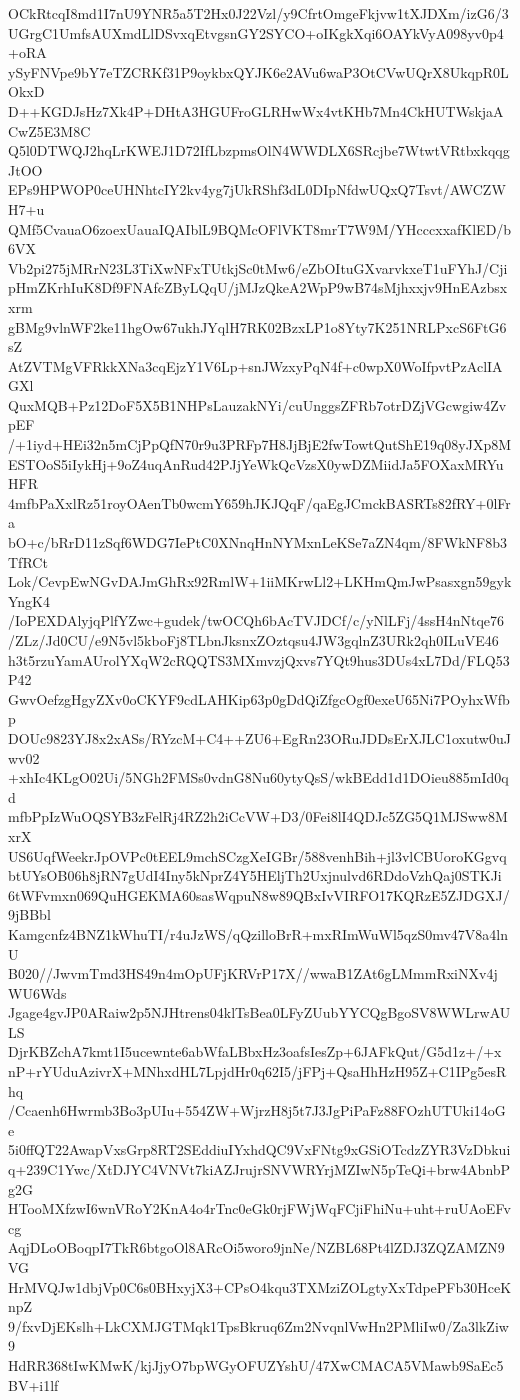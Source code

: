OCkRtcqI8md1I7nU9YNR5a5T2Hx0J22Vzl/y9CfrtOmgeFkjvw1tXJDXm/izG6/3
UGrgC1UmfsAUXmdLlDSvxqEtvgsnGY2SYCO+oIKgkXqi6OAYkVyA098yv0p4+oRA
ySyFNVpe9bY7eTZCRKf31P9oykbxQYJK6e2AVu6waP3OtCVwUQrX8UkqpR0LOkxD
D++KGDJsHz7Xk4P+DHtA3HGUFroGLRHwWx4vtKHb7Mn4CkHUTWskjaACwZ5E3M8C
Q5l0DTWQJ2hqLrKWEJ1D72IfLbzpmsOlN4WWDLX6SRcjbe7WtwtVRtbxkqqgJtOO
EPs9HPWOP0ceUHNhtcIY2kv4yg7jUkRShf3dL0DIpNfdwUQxQ7Tsvt/AWCZWH7+u
QMf5CvauaO6zoexUauaIQAIblL9BQMcOFlVKT8mrT7W9M/YHcccxxafKlED/b6VX
Vb2pi275jMRrN23L3TiXwNFxTUtkjSc0tMw6/eZbOItuGXvarvkxeT1uFYhJ/Cji
pHmZKrhIuK8Df9FNAfcZByLQqU/jMJzQkeA2WpP9wB74sMjhxxjv9HnEAzbsxxrm
gBMg9vlnWF2ke11hgOw67ukhJYqlH7RK02BzxLP1o8Yty7K251NRLPxcS6FtG6sZ
AtZVTMgVFRkkXNa3cqEjzY1V6Lp+snJWzxyPqN4f+c0wpX0WoIfpvtPzAclIAGXl
QuxMQB+Pz12DoF5X5B1NHPsLauzakNYi/cuUnggsZFRb7otrDZjVGcwgiw4ZvpEF
/+1iyd+HEi32n5mCjPpQfN70r9u3PRFp7H8JjBjE2fwTowtQutShE19q08yJXp8M
ESTOoS5iIykHj+9oZ4uqAnRud42PJjYeWkQcVzsX0ywDZMiidJa5FOXaxMRYuHFR
4mfbPaXxlRz51royOAenTb0wcmY659hJKJQqF/qaEgJCmckBASRTs82fRY+0lFra
bO+c/bRrD11zSqf6WDG7IePtC0XNnqHnNYMxnLeKSe7aZN4qm/8FWkNF8b3TfRCt
Lok/CevpEwNGvDAJmGhRx92RmlW+1iiMKrwLl2+LKHmQmJwPsasxgn59gykYngK4
/IoPEXDAlyjqPlfYZwc+gudek/twOCQh6bAcTVJDCf/c/yNlLFj/4ssH4nNtqe76
/ZLz/Jd0CU/e9N5vl5kboFj8TLbnJksnxZOztqsu4JW3gqlnZ3URk2qh0ILuVE46
h3t5rzuYamAUrolYXqW2cRQQTS3MXmvzjQxvs7YQt9hus3DUs4xL7Dd/FLQ53P42
GwvOefzgHgyZXv0oCKYF9cdLAHKip63p0gDdQiZfgcOgf0exeU65Ni7POyhxWfbp
DOUc9823YJ8x2xASs/RYzcM+C4++ZU6+EgRn23ORuJDDsErXJLC1oxutw0uJwv02
+xhIc4KLgO02Ui/5NGh2FMSs0vdnG8Nu60ytyQsS/wkBEdd1d1DOieu885mId0qd
mfbPpIzWuOQSYB3zFelRj4RZ2h2iCcVW+D3/0Fei8lI4QDJc5ZG5Q1MJSww8MxrX
US6UqfWeekrJpOVPc0tEEL9mchSCzgXeIGBr/588venhBih+jl3vlCBUoroKGgvq
btUYsOB06h8jRN7gUdI4Iny5kNprZ4Y5HEljTh2Uxjnulvd6RDdoVzhQaj0STKJi
6tWFvmxn069QuHGEKMA60sasWqpuN8w89QBxIvVIRFO17KQRzE5ZJDGXJ/9jBBbl
Kamgcnfz4BNZ1kWhuTI/r4uJzWS/qQzilloBrR+mxRImWuWl5qzS0mv47V8a4lnU
B020//JwvmTmd3HS49n4mOpUFjKRVrP17X//wwaB1ZAt6gLMmmRxiNXv4jWU6Wds
Jgage4gvJP0ARaiw2p5NJHtrens04klTsBea0LFyZUubYYCQgBgoSV8WWLrwAULS
DjrKBZchA7kmt1I5ucewnte6abWfaLBbxHz3oafsIesZp+6JAFkQut/G5d1z+/+x
nP+rYUduAzivrX+MNhxdHL7LpjdHr0q62I5/jFPj+QsaHhHzH95Z+C1IPg5esRhq
/Ccaenh6Hwrmb3Bo3pUIu+554ZW+WjrzH8j5t7J3JgPiPaFz88FOzhUTUki14oGe
5i0ffQT22AwapVxsGrp8RT2SEddiuIYxhdQC9VxFNtg9xGSiOTcdzZYR3VzDbkui
q+239C1Ywc/XtDJYC4VNVt7kiAZJrujrSNVWRYrjMZIwN5pTeQi+brw4AbnbPg2G
HTooMXfzwI6wnVRoY2KnA4o4rTnc0eGk0rjFWjWqFCjiFhiNu+uht+ruUAoEFvcg
AqjDLoOBoqpI7TkR6btgoOl8ARcOi5woro9jnNe/NZBL68Pt4lZDJ3ZQZAMZN9VG
HrMVQJw1dbjVp0C6s0BHxyjX3+CPsO4kqu3TXMziZOLgtyXxTdpePFb30HceKnpZ
9/fxvDjEKslh+LkCXMJGTMqk1TpsBkruq6Zm2NvqnlVwHn2PMliIw0/Za3lkZiw9
HdRR368tIwKMwK/kjJjyO7bpWGyOFUZYshU/47XwCMACA5VMawb9SaEc5BV+i1lf
